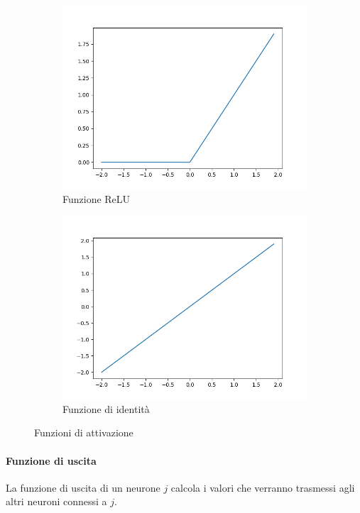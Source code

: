 \documentclass[12pt, twoside, letterpaper]{report}
\begin{document}
\begin{figure}
				\begin{subfigure}[]{.5\textwidth}
					\centering
					\includegraphics[width=.9\linewidth]{relu.png}
					\caption{Funzione ReLU}
					\label{fig:relu}
				\end{subfigure}
				\hfill
				\begin{subfigure}[]{.5\textwidth}
					\centering
					\includegraphics[width=.9\linewidth]{identity.png}
					\caption{Funzione di identità}
					\label{fig:identity}
				\end{subfigure}
				
				\caption{Funzioni di attivazione}
				\label{fig:funzioni di attivazione}
			\end{figure}	
			 	
			 \paragraph{Funzione di uscita} La funzione di uscita di un neurone $j$ calcola i valori che verranno trasmessi agli altri neuroni connessi a $j$. 
			 
\end{document}
